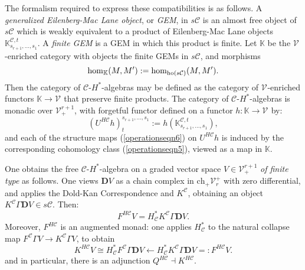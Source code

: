 \documentclass[11pt]{amsart} \renewcommand{\baselinestretch}{1.2}
\theoremstyle{plain}
\numberwithin{equation}{section} %
\theoremstyle{plain}
\numberwithin{equation}{chapter} %
\renewcommand{\to}{\longrightarrow}
\newcommand{\from}{\longleftarrow}
\newcommand{\calV}{\mathcal{V}}
\newcommand{\calc}{\mathcal{C}}
\newcommand{\vect}[2]{\calV^{#1}_{#2}}
\newcommand{\HA}[1]{H#1}
\newcommand{\complexes}{\mathrm{ch}_+}
\newcommand{\dual}{\mathbf{D}}
\begin{document}
\begin{Pi-algebras and cohomology algebras}
The formalism required to express these compatibilities is as follows. A \emph{generalized Eilenberg-Mac Lane object}, or \emph{GEM}, in $s\calc$ is an almost free object of $s\calc$ which is weakly equivalent to a product of Eilenberg-Mac Lane objects  $\mathbb{K}_{s_{r+1},\ldots,s_{1}}^{\calc,t}$. A \emph{finite GEM} is a GEM in which this product is finite. Let $\mathbb{K}$  be the $\vect{}{}$-enriched category with objects the finite GEMs in $s\calc$, and morphisms
\[\hom_{\mathbb{K}}(M,M'):=\hom_{\textup{ho}(s\calc)}(M,M').\]
Then the category of $\calc$-$H^*$-algebras  may be defined as the category of $\vect{}{}$-enriched functors $\mathbb{K}\to \vect{}{}$ that preserve finite products. The category of $\calc$-$H^*$-algebras is monadic over $\vect{r+1}{+}$, with forgetful functor defined  on a functor $h:\mathbb{K}\to \vect{}{}$  by:%
\[(U^{\HA{\calc}}h)_t^{s_{r+1},\ldots,s_1}:=h(\mathbb{K}_{s_{r+1},\ldots,s_{1}}^{\calc,t}),\]
and each of the structure maps (\ref{operationseqn6}) on $U^{\HA{\calc}}h$ is induced by the corresponding cohomology class (\ref{operationseqn5}), viewed as a map in $\mathbb{K}$. %


One obtains the free $\calc$-$H^*$-algebra on a graded vector space $V\in \vect{r+1}{+}$ \emph{of finite type} as follows. One views $\dual V$ as a chain complex in $\complexes\vect{+}{r}$ with zero differential, and applies the Dold-Kan Correspondence and $K^\calc$, obtaining an object $K^\calc\Gamma \dual V\in s\calc$. Then:
\[F^{\HA{\calc}}V=H^*_{\calc}K^\calc\Gamma\dual V.\]
Moreover, $F^{\HA{\calc}}$ is an augmented monad: one applies $H^*_{\calc}$ to the natural collapse map $F^{\calc}\Gamma V\to K^{\calc}\Gamma V$, to obtain
\[K^{\HA{\calc}}V\cong H^*_{\calc} F^{\calc}\Gamma \dual V\from H^*_{\calc} K^{\calc}\Gamma \dual V=:F^{\HA{\calc}}V.\]
and in particular, there is an adjunction $Q^{\HA{\calc}}\dashv K^{\HA{\calc}}$.


\end{Pi-algebras and cohomology algebras}
\end{document}
